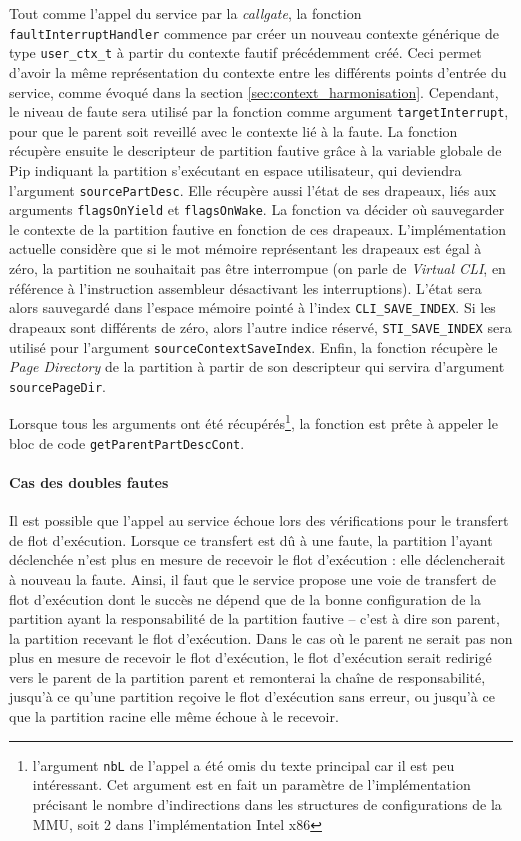 		Tout comme l'appel du service par la \emph{callgate}, la fonction \texttt{faultInterruptHandler} commence par créer un nouveau contexte générique de type \texttt{user\_ctx\_t} à partir du contexte fautif précédemment créé. Ceci permet d'avoir la même représentation du contexte entre les différents points d'entrée du service, comme évoqué dans la section \ref{sec:context_harmonisation}. Cependant, le niveau de faute sera utilisé par la fonction comme argument \texttt{targetInterrupt}, pour que le parent soit reveillé avec le contexte lié à la faute.
		La fonction récupère ensuite le descripteur de partition fautive grâce à la variable globale de Pip indiquant la partition s'exécutant en espace utilisateur, qui deviendra l'argument \texttt{sourcePartDesc}. Elle récupère aussi l'état de ses drapeaux, liés aux arguments \texttt{flagsOnYield} et \texttt{flagsOnWake}. La fonction va décider où sauvegarder le contexte de la partition fautive en fonction de ces drapeaux. L'implémentation actuelle considère que si le mot mémoire représentant les drapeaux est égal à zéro, la partition ne souhaitait pas être interrompue (on parle de \emph{Virtual CLI}, en référence à l'instruction assembleur désactivant les interruptions). L'état sera alors sauvegardé dans l'espace mémoire pointé à l'index \texttt{CLI\_SAVE\_INDEX}. Si les drapeaux sont différents de zéro, alors l'autre indice réservé, \texttt{STI\_SAVE\_INDEX} sera utilisé pour l'argument \texttt{sourceContextSaveIndex}.
		Enfin, la fonction récupère le \emph{Page Directory} de la partition à partir de son descripteur qui servira d'argument \texttt{sourcePageDir}.

		Lorsque tous les arguments ont été récupérés\footnote{l'argument \texttt{nbL} de l'appel a été omis du texte principal car il est peu intéressant. Cet argument est en fait un paramètre de l'implémentation précisant le nombre d'indirections dans les structures de configurations de la MMU, soit 2 dans l'implémentation Intel x86}, la fonction est prête à appeler le bloc de code \texttt{getParentPartDescCont}.

		\paragraph{Cas des doubles fautes} Il est possible que l'appel au service échoue lors des vérifications pour le transfert de flot d'exécution. Lorsque ce transfert est dû à une faute, la partition l'ayant déclenchée n'est plus en mesure de recevoir le flot d'exécution : elle déclencherait à nouveau la faute. Ainsi, il faut que le service propose une voie de transfert de flot d'exécution dont le succès ne dépend que de la bonne configuration de la partition ayant la responsabilité de la partition fautive -- c'est à dire son parent, la partition recevant le flot d'exécution.
		Dans le cas où le parent ne serait pas non plus en mesure de recevoir le flot d'exécution, le flot d'exécution serait redirigé vers le parent de la partition parent et remonterai la chaîne de responsabilité, jusqu'à ce qu'une partition reçoive le flot d'exécution sans erreur, ou jusqu'à ce que la partition racine elle même échoue à le recevoir.


